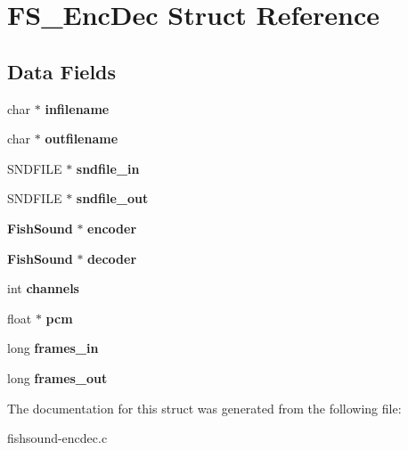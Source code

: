 \section{F\-S\-\_\-\-Enc\-Dec Struct Reference}
\label{structFS__EncDec}
\subsection*{Data Fields}
\begin{DoxyCompactItemize}
\item 
char $\ast$ {\bfseries infilename}\label{structFS__EncDec_a762f643381a90b9867a9fb7869388995}

\item 
char $\ast$ {\bfseries outfilename}\label{structFS__EncDec_af95bc9fddf4942c6c6ac324db1223739}

\item 
S\-N\-D\-F\-I\-L\-E $\ast$ {\bfseries sndfile\-\_\-in}\label{structFS__EncDec_a63cdfe09721bda3d6e4d62fbe3a592c2}

\item 
S\-N\-D\-F\-I\-L\-E $\ast$ {\bfseries sndfile\-\_\-out}\label{structFS__EncDec_a5dca5e395c542d4548b8199b48d353fd}

\item 
{\bf Fish\-Sound} $\ast$ {\bfseries encoder}\label{structFS__EncDec_aad7afeba18b1755a59d0ca54a6910714}

\item 
{\bf Fish\-Sound} $\ast$ {\bfseries decoder}\label{structFS__EncDec_a661af2889e39bb23b350d585fe6b3b13}

\item 
int {\bfseries channels}\label{structFS__EncDec_a5a5abd928df34ccb6e53ef151b2834b5}

\item 
float $\ast$ {\bfseries pcm}\label{structFS__EncDec_af3cb2d40d03b6e2e85abf4ea0b50df4b}

\item 
long {\bfseries frames\-\_\-in}\label{structFS__EncDec_adb2b0b3b8015f11f5ba1adc3e2bbcdc4}

\item 
long {\bfseries frames\-\_\-out}\label{structFS__EncDec_a8ebbfc555755b5fccc3ccf7447dd43ae}

\end{DoxyCompactItemize}


The documentation for this struct was generated from the following file\-:\begin{DoxyCompactItemize}
\item 
fishsound-\/encdec.\-c\end{DoxyCompactItemize}
